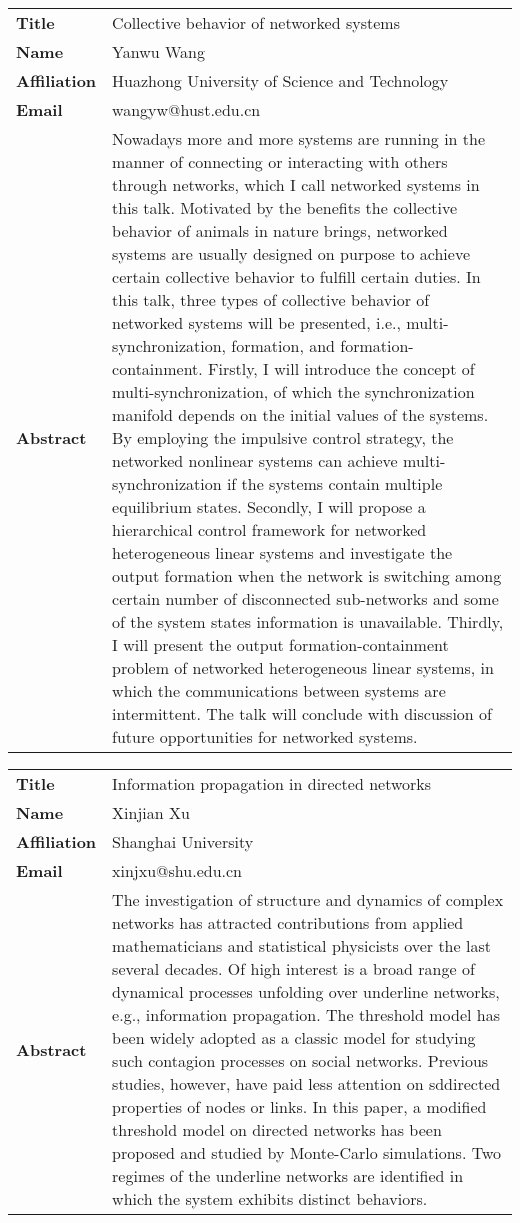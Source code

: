 \documentclass[oneside,A4paper,12pt]{article}
\begin{document}
\newpage
\begin{longtable}{p{2cm}p{14cm}}
\toprule
\textbf{Title} & Collective behavior of networked systems\\
\textbf{Name} & Yanwu Wang\\
\textbf{Affiliation} & Huazhong University of Science and Technology\\
\textbf{Email} & wangyw@hust.edu.cn\\
\textbf{Abstract} & Nowadays more and more systems are running in the manner of connecting or interacting with others through networks, which I call networked systems in this talk. Motivated by the benefits the collective behavior of animals in nature brings, networked systems are usually designed on purpose to achieve certain collective behavior to fulfill certain duties. \newline In this talk, three types of collective behavior of networked systems will be presented, i.e., multi-synchronization, formation, and formation-containment. Firstly, I will introduce the concept of multi-synchronization, of which the synchronization manifold depends on the initial values of the systems. By employing the impulsive control strategy, the networked nonlinear systems can achieve multi-synchronization if the systems contain multiple equilibrium states. Secondly, I will propose a hierarchical control framework for networked heterogeneous linear systems and investigate the output formation when the network is switching among certain number of disconnected sub-networks and some of the system states information is unavailable. Thirdly, I will present the output formation-containment problem of networked heterogeneous linear systems, in which the communications between systems are intermittent. The talk will conclude with discussion of future opportunities for networked systems.\\
\bottomrule
\end{longtable}

\newpage
\begin{longtable}{p{2cm}p{14cm}}
\toprule
\textbf{Title} & Information propagation in directed networks\\
\textbf{Name} & Xinjian Xu\\
\textbf{Affiliation} & Shanghai University\\
\textbf{Email} & xinjxu@shu.edu.cn\\
\textbf{Abstract} & The investigation of structure and dynamics of complex networks has attracted contributions from applied mathematicians and statistical physicists over the last several decades. Of high interest is a broad range of dynamical processes unfolding over underline networks, e.g., information propagation. The threshold model has been widely adopted as a classic model for studying such contagion processes on social networks. Previous studies, however, have paid less attention on sddirected properties of nodes or links. In this paper, a modified threshold model on directed networks has been proposed and studied by Monte-Carlo simulations. Two regimes of the underline networks are identified in which the system exhibits distinct behaviors.\\
\bottomrule
\end{longtable}
\end{document}
